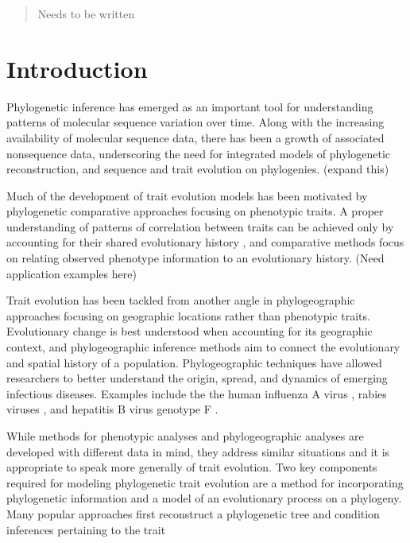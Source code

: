 \documentclass[12pt]{article}
\begin{document}
\begin{abstract}
Needs to be written 
\end{abstract}

\clearpage


\section{Introduction} 

Phylogenetic inference has emerged as an important tool for understanding patterns of molecular sequence variation
over time.  Along with the increasing availability of molecular sequence data, there has been a growth of associated nonsequence data,
underscoring the need for integrated models of phylogenetic reconstruction, and sequence and trait evolution on phylogenies. (expand this)
\par
Much of the development of trait evolution models has been motivated by phylogenetic comparative approaches focusing
on phenotypic traits.  A proper understanding of patterns of correlation between traits can be achieved only by accounting for
their shared evolutionary history \citep{Felsenstein1985, Harvey1991}, and comparative methods focus on relating observed phenotype information to an 
evolutionary history. (Need application examples here)
\par
Trait evolution has been tackled from another angle in phylogeographic approaches
focusing on geographic locations rather than phenotypic traits.  Evolutionary change is best understood when accounting for its geographic context, 
and phylogeographic inference methods aim to connect the evolutionary and spatial history of a population.  Phylogeographic techniques have allowed
researchers to better understand the origin, spread, and dynamics of emerging infectious diseases.  Examples include the
the human influenza A virus \citep{Rambaut2008, Russell2008, Smith2009, Lemey09}, rabies
viruses \citep{Biek2007, Seetahal2013}, and hepatitis B virus genotype F \citep{Mello2013}.
\par
While methods for phenotypic analyses and phylogeographic analyses are developed with different data in mind, they 
address similar situations and it is appropriate to speak more generally of trait evolution.  Two key components required
for modeling phylogenetic trait evolution are a method for incorporating phylogenetic information and a model of an evolutionary
process on a phylogeny.  Many popular approaches first reconstruct a phylogenetic tree and condition inferences pertaining to the trait 
\end{document}

